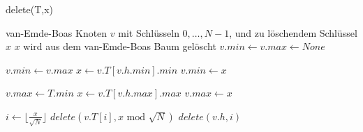 \begin{algorithm}[H]
\caption{delete(T,x)}
\label{algorithm1}
\begin{algorithmic}
\REQUIRE van-Emde-Boas Knoten $v$ mit Schlüsseln $0,\dots,N-1$, und zu löschendem Schlüssel $x$ 
\ENSURE $x$ wird aus dem van-Emde-Boas Baum gelöscht
	\STATE $v.min \leftarrow v.max \leftarrow None$
	\RETURN
\ENDIF

		\STATE $v.min \leftarrow v.max$
		\RETURN
	\ELSE
		\STATE $x \leftarrow v.T[v.h.min].min$
		\STATE $v.min \leftarrow x$
	\ENDIF
\ENDIF

		\STATE $v.max \leftarrow T.min$
		\RETURN
	\ELSE
		\STATE $x \leftarrow v.T[v.h.max].max$
		\STATE $v.max \leftarrow x$
	\ENDIF
\ENDIF

	\RETURN
\ENDIF

\STATE $i \leftarrow \lfloor \frac{x}{\sqrt{N}} \rfloor$
\STATE $delete(v.T[i], x \text{ mod } \sqrt{N})$
	\STATE $delete(v.h, i)$
\ENDIF
\RETURN
\end{algorithmic}
\end{algorithm}


